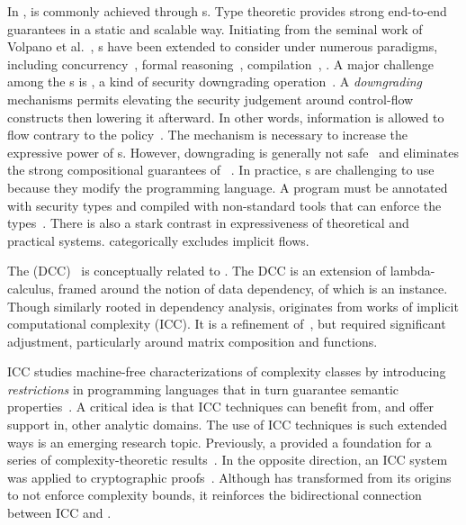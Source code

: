 In ,  is commonly achieved through s.
Type theoretic  provides strong end-to-end  guarantees in a static and scalable way.
Initiating from the seminal work of Volpano et al.~\cite{volpanoI1996}, s have been extended to consider  under numerous paradigms,
including concurrency~\cite{volpano1998,derakhshan2024,frumin2021}, formal reasoning~\cite{nelson2020,frumin2021}, compilation~\cite{barthe2004}, \etc.
A major challenge among the s is \emph{}, a kind of security downgrading operation~\cite{cecchetti2017}. A \emph{downgrading} mechanisms permits elevating the security judgement around control-flow constructs then lowering it afterward.
In other words, information is allowed to flow contrary to the policy~\cite{cecchetti2017}.
The mechanism is necessary to increase the expressive power of s.
However, downgrading is generally not safe~\cite{derakhshan2024} and eliminates the strong compositional guarantees of ~\cite{cecchetti2017}.
In practice, s are challenging to use because they modify the programming language.
A program must be annotated with security types and compiled with non-standard tools that can enforce the types~\cite{lamba2024}.
There is also a stark contrast in expressiveness of theoretical and practical systems.
\Eg \cite{huang2014} categorically excludes implicit flows.

The  (DCC)~\cite{abadi1999b} is conceptually related to \lname.
The DCC is an extension of lambda-calculus, framed around the notion of data dependency, of which  is an instance.
Though similarly rooted in dependency analysis, \lname originates from works of implicit computational complexity (ICC).
It is a refinement of~\cite{moyen20172,aubert20232}, but \lname required significant adjustment, particularly around matrix composition and functions.

ICC studies machine-free characterizations of complexity classes by introducing \emph{restrictions} in programming languages that in turn guarantee semantic properties~\cite{dallago2011}.
A critical idea is that ICC techniques can benefit from, and offer support in, other analytic domains.
The use of ICC techniques is such extended ways is an emerging research topic.
Previously, a   provided a foundation for a series of complexity-theoretic results~\cite{marion2011,hainry2023}.
In the opposite direction, an ICC system was applied to cryptographic proofs~\cite{baillot2019}.
Although \lname has transformed from its origins to not enforce complexity bounds, it reinforces the bidirectional connection between ICC and .

